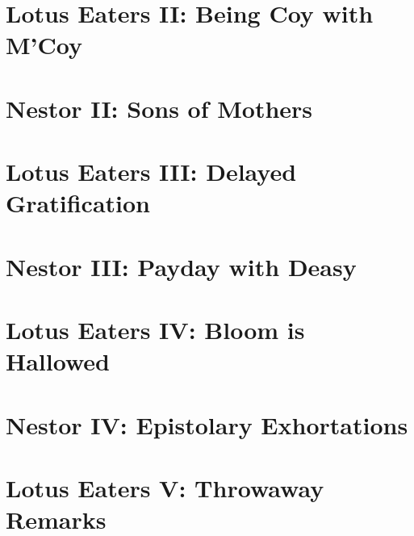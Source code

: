 \section*{Lotus Eaters II: Being Coy with M'Coy}


\section*{Nestor II: Sons of Mothers}


\section*{Lotus Eaters III: Delayed Gratification}


\section*{Nestor III: Payday with Deasy}


\section*{Lotus Eaters IV: Bloom is Hallowed}


\section*{Nestor IV: Epistolary Exhortations}


\section*{Lotus Eaters V: Throwaway Remarks}



